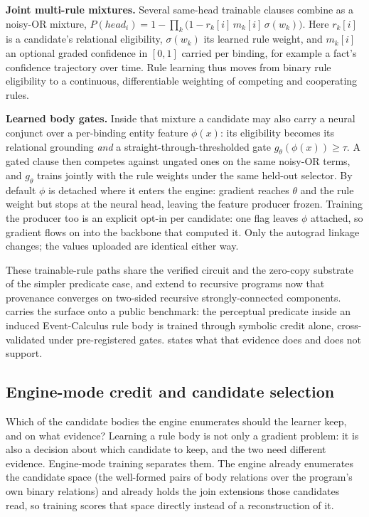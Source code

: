 \textbf{Joint multi-rule mixtures.} Several same-head trainable clauses combine as a noisy-OR mixture, $P(\mathit{head}_i)=1-\prod_k\bigl(1-r_k[i]\,m_k[i]\,\sigma(w_k)\bigr)$. Here $r_k[i]$ is a candidate's relational eligibility, $\sigma(w_k)$ its learned rule weight, and $m_k[i]$ an optional graded confidence in $[0,1]$ carried per binding, for example a fact's confidence trajectory over time. Rule learning thus moves from binary rule eligibility to a continuous, differentiable weighting of competing and cooperating rules.

\textbf{Learned body gates.} Inside that mixture a candidate may also carry a neural conjunct over a per-binding entity feature $\phi(x)$: its eligibility becomes its relational grounding \emph{and} a straight-through-thresholded gate $g_\theta(\phi(x))\ge\tau$. A gated clause then competes against ungated ones on the same noisy-OR terms, and $g_\theta$ trains jointly with the rule weights under the same held-out selector. By default $\phi$ is detached where it enters the engine: gradient reaches $\theta$ and the rule weight but stops at the neural head, leaving the feature producer frozen. Training the producer too is an explicit opt-in per candidate: one flag leaves $\phi$ attached, so gradient flows on into the backbone that computed it. Only the autograd linkage changes; the values uploaded are identical either way.

These trainable-rule paths share the verified circuit and the zero-copy substrate of the simpler predicate case, and extend to recursive programs now that provenance converges on two-sided recursive strongly-connected components.  carries the surface onto a public benchmark: the perceptual predicate inside an induced Event-Calculus rule body is trained through symbolic credit alone, cross-validated under pre-registered gates.  states what that evidence does and does not support.

\subsection{Engine-mode credit and candidate selection}\label{subsec:engine-mode}

Which of the candidate bodies the engine enumerates should the learner keep, and on what evidence? Learning a rule body is not only a gradient problem: it is also a decision about which candidate to keep, and the two need different evidence. Engine-mode training separates them. The engine already enumerates the candidate space (the well-formed pairs of body relations over the program's own binary relations) and already holds the join extensions those candidates read, so training scores that space directly instead of a reconstruction of it.

